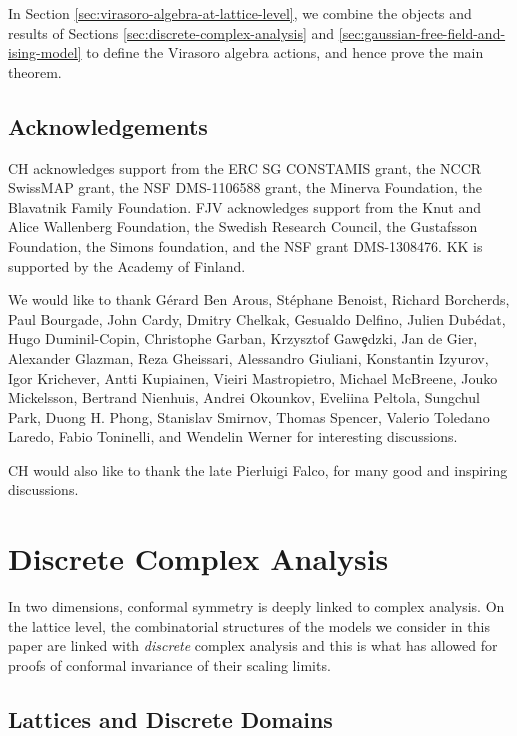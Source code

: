 \documentclass[12pt,oneside,english]{amsart}
\numberwithin{equation}{section}
\numberwithin{figure}{section}
\theoremstyle{plain}
\theoremstyle{plain}
\theoremstyle{plain}
\theoremstyle{plain}
\theoremstyle{remark}
\theoremstyle{definition}
\theoremstyle{plain}
\theoremstyle{plain}
\numberwithin{thm}{section}
\begin{document}
In Section \ref{sec:virasoro-algebra-at-lattice-level}, we combine
the objects and results of Sections \ref{sec:discrete-complex-analysis}
and \ref{sec:gaussian-free-field-and-ising-model} to define the Virasoro
algebra actions, and hence prove the main theorem.

\subsection{Acknowledgements}

CH acknowledges support from the ERC SG CONSTAMIS grant, the NCCR
SwissMAP grant, the NSF DMS-1106588 grant, the Minerva Foundation,
the Blavatnik Family Foundation. FJV acknowledges support from the
Knut and Alice Wallenberg Foundation, the Swedish Research Council,
the Gustafsson
Foundation, the Simons foundation, and the NSF grant DMS-1308476.
KK is supported by the Academy of Finland.

We would like to thank G\'erard Ben Arous, St\'ephane Benoist, Richard
Borcherds, Paul Bourgade, John Cardy, Dmitry Chelkak, Gesualdo Delfino,
Julien Dub\'edat, Hugo Duminil-Copin, Christophe Garban, Krzysztof Gaw\c{e}dzki,
Jan de Gier, Alexander Glazman, Reza Gheissari, Alessandro Giuliani,
Konstantin Izyurov, Igor Krichever, Antti Kupiainen, Vieiri Mastropietro,
Michael McBreene, Jouko Mickelsson, Bertrand Nienhuis, Andrei Okounkov,
Eveliina Peltola, Sungchul Park, Duong H. Phong, Stanislav Smirnov,
Thomas Spencer, Valerio Toledano Laredo, Fabio Toninelli, and Wendelin
Werner for interesting discussions.

CH would also like to thank the late Pierluigi Falco, for many good
and inspiring discussions.

\section{\label{sec:discrete-complex-analysis}Discrete Complex Analysis}

In two dimensions, conformal symmetry is deeply linked to complex
analysis. On the lattice level, the combinatorial structures of the
models we consider in this paper are linked with \emph{discrete} complex
analysis and this is what has allowed for proofs of conformal invariance
of their scaling limits.

\subsection{\label{subsec:lattices-and-discrete-domains}Lattices and Discrete
Domains}
\end{document}
